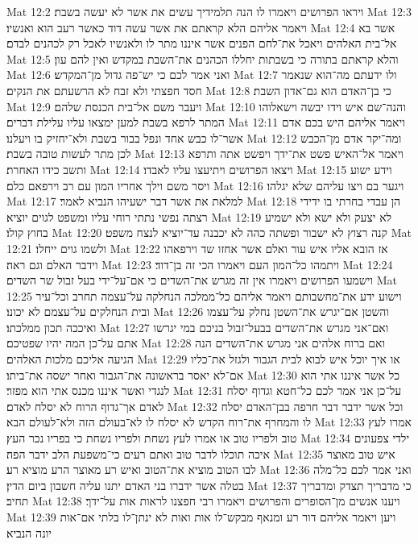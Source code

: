 Mat 12:2  ויראו הפרושים ויאמרו לו הנה תלמידיך עשים את אשר לא יעשה בשבת׃
Mat 12:3  ויאמר אליהם הלא קראתם את אשר עשה דוד כאשר רעב הוא ואנשיו׃
Mat 12:4  אשר בא אל־בית האלהים ויאכל את־לחם הפנים אשר איננו מתר לו ולאנשיו לאכל רק לכהנים לבדם׃
Mat 12:5  והלא קראתם בתורה כי בשבתות יחללו הכהנים את־השבת במקדש ואין להם עון׃
Mat 12:6  ואני אמר לכם כי יש־פה גדול מן־המקדש׃
Mat 12:7  ולו ידעתם מה־הוא שנאמר חסד חפצתי ולא זבח לא הרשעתם את הנקים׃
Mat 12:8  כי בן־האדם הוא גם־אדון השבת׃
Mat 12:9  ויעבר משם אל־בית הכנסת שלהם׃
Mat 12:10  והנה־שם איש וידו יבשה וישאלוהו המתר לרפא בשבת למען ימצאו עליו עלילת דברים׃
Mat 12:11  ויאמר אליהם היש בכם אדם אשר־לו כבש אחד ונפל בבור בשבת ולא־יחזיק בו ויעלנו׃
Mat 12:12  ומה־יקר אדם מן־הכבש לכן מתר לעשות טובה בשבת׃
Mat 12:13  ויאמר אל־האיש פשט את־ידך ויפשט אתה ותרפא ותשב כידו האחרת׃
Mat 12:14  ויצאו הפרושים ויתיעצו עליו לאבדו׃
Mat 12:15  וידע ישוע ויסר משם וילך אחריו המון עם רב וירפאם כלם׃
Mat 12:16  ויגער בם ויצו עליהם שלא יגלהו׃
Mat 12:17  למלאת את אשר דבר ישעיהו הנביא לאמר׃
Mat 12:18  הן עבדי בחרתי בו ידידי רצתה נפשי נתתי רוחי עליו ומשפט לגוים יוציא׃
Mat 12:19  לא יצעק ולא ישא ולא ישמיע בחוץ קולו׃
Mat 12:20  קנה רצוץ לא ישבור ופשתה כהה לא יכבנה עד־יוציא לנצח משפט׃
Mat 12:21  ולשמו גוים ייחלו׃
Mat 12:22  אז הובא אליו איש עור ואלם אשר אחזו שד וירפאהו וידבר האלם וגם ראה׃
Mat 12:23  ויתמהו כל־המון העם ויאמרו הכי זה בן־דוד׃
Mat 12:24  וישמעו הפרושים ויאמרו אין זה מגרש את־השדים כי אם־על־ידי בעל זבול שר השדים׃
Mat 12:25  וישוע ידע את־מחשבותם ויאמר אליהם כל־ממלכה הנחלקה על־עצמה תחרב וכל־עיר ובית הנחלקים על־עצמם לא יכונו׃
Mat 12:26  והשטן אם־יגרש את־השטן נחלק על־עצמו ואיככה תכון ממלכתו׃
Mat 12:27  ואם־אני מגרש את־השדים בבעל־זבול בניכם במי יגרשו אתם על־כן המה יהיו שפטיכם׃
Mat 12:28  ואם ברוח אלהים אני מגרש את־השדים הנה הגיעה אליכם מלכות האלהים׃
Mat 12:29  או איך יוכל איש לבוא לבית הגבור ולגזל את־כליו אם־לא יאסר בראשונה את־הגבור ואחר ישסה את־ביתו׃
Mat 12:30  כל אשר איננו אתי הוא לנגדי ואשר איננו מכנס אתי הוא מפזר׃
Mat 12:31  על־כן אני אמר לכם כל־חטא וגדוף יסלח לאדם אך־גדוף הרוח לא יסלח לאדם׃
Mat 12:32  וכל אשר ידבר דבר חרפה בבן־האדם יסלח לו והמחרף את־רוח הקדש לא יסלח לו לא־בעולם הזה ולא־לעולם הבא׃
Mat 12:33  אמרו לעץ טוב ולפריו טוב או אמרו לעץ נשחת ולפריו נשחת כי בפריו נכר העץ׃
Mat 12:34  ילדי צפעונים איכה תוכלו לדבר טוב ואתם רעים כי־משפעת הלב ידבר הפה׃
Mat 12:35  איש טוב מאוצר לבו הטוב מוציא את־הטוב ואיש רע מאוצר הרע מוציא רע׃
Mat 12:36  ואני אמר לכם כל־מלה בטלה אשר ידברו בני האדם יתנו עליה חשבון ביום הדין׃
Mat 12:37  כי מדבריך תצדק ומדבריך תחיב׃
Mat 12:38  ויענו אנשים מן־הסופרים והפרושים ויאמרו רבי חפצנו לראות אות על־ידך׃
Mat 12:39  ויען ויאמר אליהם דור רע ומנאף מבקש־לו אות ואות לא ינתן־לו בלתי אם־אות יונה הנביא׃
